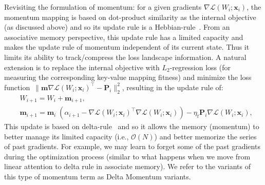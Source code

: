 \documentclass{article}
\newcommand{\citep}{\parencite}
\newcommand{\head}[1]{\vspace{1.7mm}\noindent{{\textcolor{c4}{\bf #1.}}}}
\newcommand{\vm}{\boldsymbol{m}}
\newcommand{\vp}{\boldsymbol{P}}
\begin{document}
\head{Extension: More Expressive Objectives}
Revisiting the formulation of momentum: for a given gradients $\nabla \mathcal{L}\left(W_{i};\boldsymbol{x}_i\right)$, the momentum mapping is based on dot-product similarity as the internal objective (as discussed above) and so its update rule is a Hebbian-rule~\citep{hebb2005organization}. From an associative memory perspective, this update rule has a limited capacity
\citep{storkey1997increasing} and makes the update rule of momentum independent of its current state. Thus it limits its ability to track/compress the  loss landscape information.
A natural extension is to replace the internal objective with $L_2$-regression loss (for measuring the corresponding key-value mapping fitness) and minimize the loss function~$\|\vm  \nabla \mathcal{L}(W_i;\boldsymbol{x}_i)^{\top} - \vp_i\|^2_2$, resulting in the update rule of:
\begin{align}
    &W_{i+1} = W_i + \mathbf{m}_{i+1},\\ \label{eq:momentum-delta}
    &\mathbf{m}_{i+1} =\mathbf{m}_{i} \;  \left(\alpha_{i+1} -  \nabla \mathcal{L}\left(W_{i};\boldsymbol{x}_i\right)^{\top} \nabla \mathcal{L}\left(W_{i};\boldsymbol{x}_i\right) \right)  - \eta_t \vp_i  \nabla \mathcal{L}\left(W_{i};\boldsymbol{x}_i\right), 
\end{align}
This update is based on delta-rule~\citep{prados1989neural} and so it allows the memory (momentum) to better manage its limited capacity (i.e., $\mathcal{O}(N)$) and better memorize the series of past gradients. 
For example, we may learn to forget some of the past gradients during the optimization process (similar to what happens when we move from linear attention to delta rule in associate memory).
We refer to the variants of this type of momentum term as Delta Momentum variants. 
\end{document}
